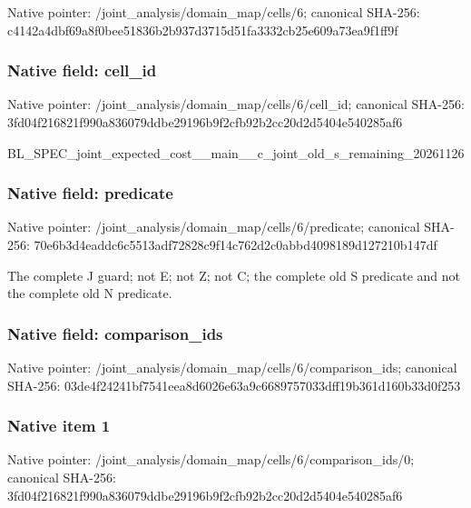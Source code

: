 \documentclass[10pt,a4paper]{article}
\begin{document}
Native pointer: /joint\_analysis/domain\_map/cells/6; canonical SHA-256: c4142a4dbf69a8f0bee51836\allowbreak{}b2b937d3715d51fa3332cb25\allowbreak{}e609a73ea9f1ff9f



\subsubsection{Native field: cell\_id}


Native pointer: /joint\_analysis/domain\_m\allowbreak{}ap/cells/6/cell\_id; canonical SHA-256: 3fd04f216821f990a836079d\allowbreak{}dbe29196b9f2cfb92b2cc20d\allowbreak{}2d5404e540285af6


BL\_SPEC\_joint\_expected\_c\allowbreak{}ost\_\_main\_\_c\_joint\_old\_s\allowbreak{}\_remaining\_20261126


\subsubsection{Native field: predicate}


Native pointer: /joint\_analysis/domain\_m\allowbreak{}ap/cells/6/predicate; canonical SHA-256: 70e6b3d4eaddc6c5513adf72\allowbreak{}828c9f14c762d2c0abbd4098\allowbreak{}189d127210b147df


The complete J guard; not E; not Z; not C; the complete old S predicate and not the complete old N predicate.


\subsubsection{Native field: comparison\_ids}


Native pointer: /joint\_analysis/domain\_m\allowbreak{}ap/cells/6/comparison\_id\allowbreak{}s; canonical SHA-256: 03de4f24241bf7541eea8d60\allowbreak{}26e63a9c6689757033dff19b\allowbreak{}361d160b33d0f253



\subsubsection{Native item 1}


Native pointer: /joint\_analysis/domain\_m\allowbreak{}ap/cells/6/comparison\_id\allowbreak{}s/0; canonical SHA-256: 3fd04f216821f990a836079d\allowbreak{}dbe29196b9f2cfb92b2cc20d\allowbreak{}2d5404e540285af6
\end{document}

